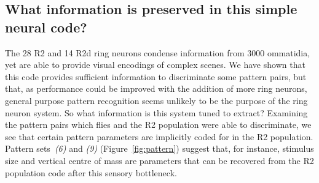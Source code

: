 \subsection*{What information is preserved in this simple neural code?}
The 28 R2 and 14 R2d ring neurons condense information from 3000 ommatidia, yet are able to provide visual encodings of complex scenes. We have shown that this code provides sufficient information to discriminate some pattern pairs, but that, as performance could be improved with the addition of more ring neurons, general purpose pattern recognition seems unlikely to be the purpose of the ring neuron system. So what information is this system tuned to extract? Examining the pattern pairs which flies and the R2 population were able to discriminate, we see that certain pattern parameters are implicitly coded for in the R2 population. Pattern sets~\emph{(6)} and \emph{(9)} (Figure~\ref{fig:pattern}) suggest that, for instance, stimulus size and vertical centre of mass are parameters that can be recovered from the R2 population code after this sensory bottleneck.


